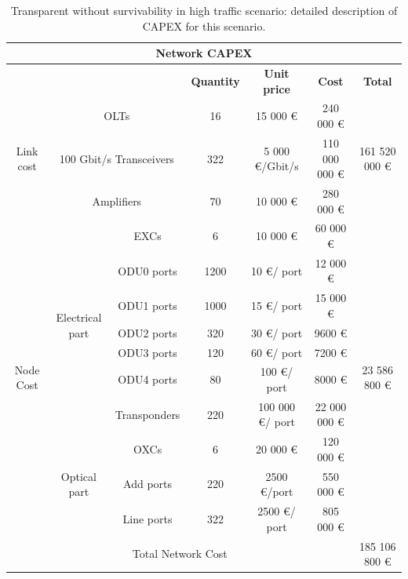 \begin{table}[H]
	\begin{tabular}{|c|c|c|c|c|c|c|}
		\hline
		\multicolumn{7}{|c|}{\textbf{Network CAPEX}} \\ \hline
		\multicolumn{3}{|c|}{} & \textbf{Quantity} & \textbf{Unit price} & \textbf{Cost} & \textbf{Total} \\ \hline
		\multirow{3}{*}{Link cost} & \multicolumn{2}{c|}{OLTs} & 16 & 15 000 \euro & 240 000 \euro & \multirow{3}{*}{161 520 000 \euro} \\ \cline{2-6}
		& \multicolumn{2}{c|}{100 Gbit/s Transceivers} & 322 & 5 000 \euro/Gbit/s & 110 000 000 \euro &  \\ \cline{2-6}
		& \multicolumn{2}{c|}{Amplifiers} & 70 & 10 000 \euro & 280 000 \euro &  \\ \hline
		\multirow{10}{*}{Node Cost} & \multirow{7}{*}{Electrical part} & EXCs & 6 & 10 000 \euro & 60 000 \euro & \multirow{10}{*}{23 586 800 \euro} \\ \cline{3-6}
		&  & ODU0 ports & 1200 & 10 \euro/ port & 12 000 \euro &  \\ \cline{3-6}
		&  & ODU1 ports & 1000 & 15 \euro/ port & 15 000 \euro &  \\ \cline{3-6}
		&  & ODU2 ports & 320 & 30 \euro/ port & 9600 \euro &  \\ \cline{3-6}
		&  & ODU3 ports & 120 & 60 \euro/ port & 7200 \euro &  \\ \cline{3-6}
		&  & ODU4 ports & 80 & 100 \euro/ port & 8000 \euro &  \\ \cline{3-6}
		&  & Transponders & 220 & 100 000 \euro/ port & 22 000 000 \euro &  \\ \cline{2-6}
		& \multirow{3}{*}{Optical part} & OXCs & 6 & 20 000 \euro & 120 000 \euro &  \\ \cline{3-6}
		&  & Add ports & 220 & 2500 \euro/port & 550 000 \euro &  \\ \cline{3-6}
		&  & Line ports & 322 & 2500 \euro/ port & 805 000 \euro &  \\ \hline
		\multicolumn{6}{|c|}{Total Network Cost} & 185 106 800 \euro \\ \hline
	\end{tabular}
	\caption{Transparent without survivability in high traffic scenario: detailed description of CAPEX for this scenario.}
\end{table}

